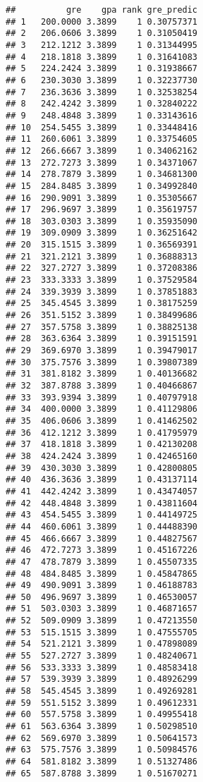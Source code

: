 \documentclass[
]{article}
\begin{document}
\begin{verbatim}
##          gre    gpa rank gre_predic
## 1   200.0000 3.3899    1 0.30757371
## 2   206.0606 3.3899    1 0.31050419
## 3   212.1212 3.3899    1 0.31344995
## 4   218.1818 3.3899    1 0.31641083
## 5   224.2424 3.3899    1 0.31938667
## 6   230.3030 3.3899    1 0.32237730
## 7   236.3636 3.3899    1 0.32538254
## 8   242.4242 3.3899    1 0.32840222
## 9   248.4848 3.3899    1 0.33143616
## 10  254.5455 3.3899    1 0.33448416
## 11  260.6061 3.3899    1 0.33754605
## 12  266.6667 3.3899    1 0.34062162
## 13  272.7273 3.3899    1 0.34371067
## 14  278.7879 3.3899    1 0.34681300
## 15  284.8485 3.3899    1 0.34992840
## 16  290.9091 3.3899    1 0.35305667
## 17  296.9697 3.3899    1 0.35619757
## 18  303.0303 3.3899    1 0.35935090
## 19  309.0909 3.3899    1 0.36251642
## 20  315.1515 3.3899    1 0.36569391
## 21  321.2121 3.3899    1 0.36888313
## 22  327.2727 3.3899    1 0.37208386
## 23  333.3333 3.3899    1 0.37529584
## 24  339.3939 3.3899    1 0.37851883
## 25  345.4545 3.3899    1 0.38175259
## 26  351.5152 3.3899    1 0.38499686
## 27  357.5758 3.3899    1 0.38825138
## 28  363.6364 3.3899    1 0.39151591
## 29  369.6970 3.3899    1 0.39479017
## 30  375.7576 3.3899    1 0.39807389
## 31  381.8182 3.3899    1 0.40136682
## 32  387.8788 3.3899    1 0.40466867
## 33  393.9394 3.3899    1 0.40797918
## 34  400.0000 3.3899    1 0.41129806
## 35  406.0606 3.3899    1 0.41462502
## 36  412.1212 3.3899    1 0.41795979
## 37  418.1818 3.3899    1 0.42130208
## 38  424.2424 3.3899    1 0.42465160
## 39  430.3030 3.3899    1 0.42800805
## 40  436.3636 3.3899    1 0.43137114
## 41  442.4242 3.3899    1 0.43474057
## 42  448.4848 3.3899    1 0.43811604
## 43  454.5455 3.3899    1 0.44149725
## 44  460.6061 3.3899    1 0.44488390
## 45  466.6667 3.3899    1 0.44827567
## 46  472.7273 3.3899    1 0.45167226
## 47  478.7879 3.3899    1 0.45507335
## 48  484.8485 3.3899    1 0.45847865
## 49  490.9091 3.3899    1 0.46188783
## 50  496.9697 3.3899    1 0.46530057
## 51  503.0303 3.3899    1 0.46871657
## 52  509.0909 3.3899    1 0.47213550
## 53  515.1515 3.3899    1 0.47555705
## 54  521.2121 3.3899    1 0.47898089
## 55  527.2727 3.3899    1 0.48240671
## 56  533.3333 3.3899    1 0.48583418
## 57  539.3939 3.3899    1 0.48926299
## 58  545.4545 3.3899    1 0.49269281
## 59  551.5152 3.3899    1 0.49612331
## 60  557.5758 3.3899    1 0.49955418
## 61  563.6364 3.3899    1 0.50298510
## 62  569.6970 3.3899    1 0.50641573
## 63  575.7576 3.3899    1 0.50984576
## 64  581.8182 3.3899    1 0.51327486
## 65  587.8788 3.3899    1 0.51670271

\end{verbatim}
\end{document}
